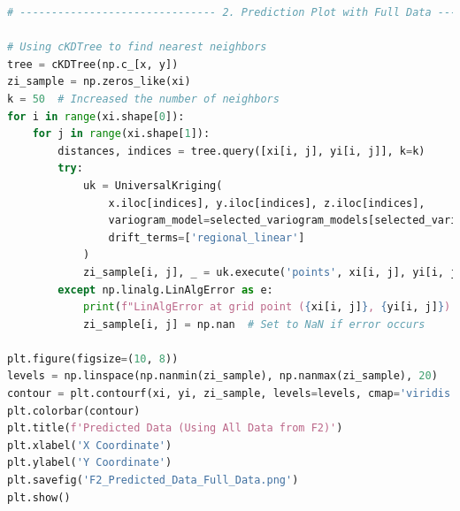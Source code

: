 \documentclass{swmcmthesis}
\begin{document}
\begin{lstlisting}[language=python,caption={The python programme for Problem 4}]
# ------------------------------- 2. Prediction Plot with Full Data ------------------------------- #

# Using cKDTree to find nearest neighbors
tree = cKDTree(np.c_[x, y])
zi_sample = np.zeros_like(xi)
k = 50  # Increased the number of neighbors
for i in range(xi.shape[0]):
    for j in range(xi.shape[1]):
        distances, indices = tree.query([xi[i, j], yi[i, j]], k=k)
        try:
            uk = UniversalKriging(
                x.iloc[indices], y.iloc[indices], z.iloc[indices],
                variogram_model=selected_variogram_models[selected_variables[0]],  # Use the first variable's model
                drift_terms=['regional_linear']
            )
            zi_sample[i, j], _ = uk.execute('points', xi[i, j], yi[i, j])
        except np.linalg.LinAlgError as e:
            print(f"LinAlgError at grid point ({xi[i, j]}, {yi[i, j]}): {e}")
            zi_sample[i, j] = np.nan  # Set to NaN if error occurs

plt.figure(figsize=(10, 8))
levels = np.linspace(np.nanmin(zi_sample), np.nanmax(zi_sample), 20)
contour = plt.contourf(xi, yi, zi_sample, levels=levels, cmap='viridis')
plt.colorbar(contour) 
plt.title(f'Predicted Data (Using All Data from F2)')
plt.xlabel('X Coordinate')
plt.ylabel('Y Coordinate')
plt.savefig('F2_Predicted_Data_Full_Data.png')
plt.show()
\end{lstlisting}

%
\end{document}
